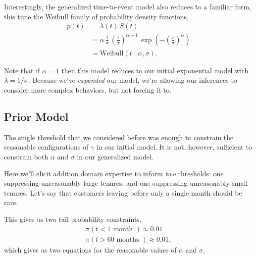 \documentclass[
  letterpaper,
  DIV=11,
  numbers=noendperiod]{scrartcl}
\begin{document}
Interestingly, the generalized time-to-event model also reduces to a
familiar form, this time the Weibull family of probability density
functions, \begin{align*}
p(t)
&=
\lambda(t) \, S(t)
\\
&=
\alpha \, \frac{1}{\sigma} \,
\left( \frac{t}{\sigma} \right)^{\alpha - 1} \,
\exp \left( - \left( \frac{t}{\sigma} \right)^{\alpha} \right)
\\
&= \mathrm{Weibull}(t \mid \alpha, \sigma).
\end{align*}

Note that if \(\alpha = 1\) then this model reduces to our initial
exponential model with \(\lambda = 1 / \sigma\). Because we've
\emph{expanded} our model, we're allowing our inferences to consider
more complex behaviors, but not forcing it to.

\subsection{Prior Model}\label{prior-model-1}

The single threshold that we considered before was enough to constrain
the reasonable configurations of \(\gamma\) in our initial model. It is
not, however, sufficient to constrain both \(\alpha\) and \(\sigma\) in
our generalized model.

Here we'll elicit addition domain expertise to inform \emph{two}
thresholds: one suppressing unreasonably large tenures, and one
suppressing unreasonably small tenures. Let's say that customers leaving
before only a single month should be rare.

This gives us two tail probability constraints, \begin{align*}
\pi( t < 1 \text{ month } ) \approx 0.01
\\
\pi( t > 60 \text{ months } ) \approx 0.01,
\end{align*} which gives us two equations for the reasonable values of
\(\alpha\) and \(\sigma\).
\end{document}

